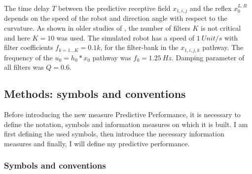 The time delay $T$ between the predictive receptive field $x_{1,i,j}$ and 
the reflex $x_0^{L,R}$ depends on the
speed of the robot and direction angle with respect to the
curvature. As shown in older studies of
\cite{Porr2003b,Porr2006ICO}, the number of filters $K$ is not critical and
here $K=10$ was used. The simulated robot has a speed of $1~Unit/s$
with filter coefficients $f_{k=1\ldots K}=0.1 k$, for the
filter-bank in the $x_{1,i,j,k}$ pathway. The frequency of the $u_0 = h_0 * x_0$ 
pathway was
$f_0=1.25~Hz$. Damping parameter of all filters was $Q=0.6$.



\subsection{Methods: symbols and conventions}

Before introducing the new measure Predictive Performance, it is necessary to
define the notation, symbols and information measures on which it is built. I am
first defining the used symbols, then introduce the necessary
information measures and finally, I will define my predictive performance.


\subsubsection{Symbols and conventions}

